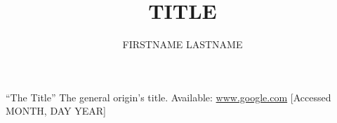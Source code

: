 \documentclass[
paper = a4,
fontsize = 12pt,
headinclude = true,
open = right,
twoside = true,
BCOR = 10mm,
toc = listofnumbered,
numbers = noendperiod,
]{report}
\title{TITLE}
\author{FIRSTNAME LASTNAME}
\date{\currenttime}
\begin{document}
    

    \clearpage

    \tableofcontents
    \clearpage

    

    

    

    

    \clearpage

    \clearpage

\begin{thebibliography}{9}

 ``The Title'' The general origin's title. Available: \url{www.google.com} [Accessed MONTH, DAY YEAR]

\end{thebibliography}
\end{document}
